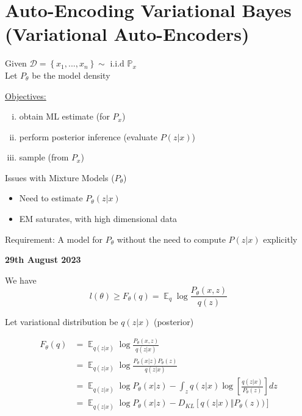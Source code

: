 \documentclass[11pt]{article}
\DeclareMathOperator*{\E}{\mathbb{E}}
\begin{document}
\section{Auto-Encoding Variational Bayes \\(Variational Auto-Encoders)}
\label{sec:auto-encod-vari}

Given $\mathcal{D} = \left\{ x_1, ..., x_n \right\} \sim \text{ i.i.d } \mathbb{P}_x$ \\
Let $P_{\theta}$ be the model density

\underline{Objectives:}
\begin{enumerate}[(i)]
\item\label{item:1} obtain ML estimate (for $P_x$)
\item\label{item:2} perform posterior inference (evaluate $P(z|x)$)
\item\label{item:3} sample (from $P_x$)
\end{enumerate}

\begin{framed}
  Issues with Mixture Models ($P_{\theta}$) 
  \begin{itemize}
  \item  Need to estimate $P_{\theta}(z | x)$
  \item EM saturates, with high dimensional data
  \end{itemize}
\end{framed}

Requirement: A model for $P_{\theta}$ without the need to compute $P(z|x)$ explicitly
\vspace{1em}

\textbf{29th August 2023}

We have
\[ l(\theta) \geq F_{\theta}(q) = \E_q \log \frac{P_{\theta}(x, z)}{q(z)} \]

Let variational distribution be $q(z|x)$ (posterior)

\begin{align*}
  F_{\theta}(q) &= \E_{q(z|x)} \log \frac{P_{\theta}(x, z)}{q(z|x)} \\
                &= \E_{q(z|x)} \log \frac{P_{\theta}(x|z)P_{\theta}(z)}{q(z|x)} \\
                &= \E_{q(z|x)} \log P_{\theta}(x|z) - \int_z q(z|x) \log \left[ \frac{q(z|x)}{P_{\theta}(z)} \right] dz \\
                &= \E_{q(z|x)} \log P_{\theta}(x|z) - D_{KL}\left[ q(z|x) \Vert P_{\theta}(z)) \right]
\end{align*}
\end{document}
